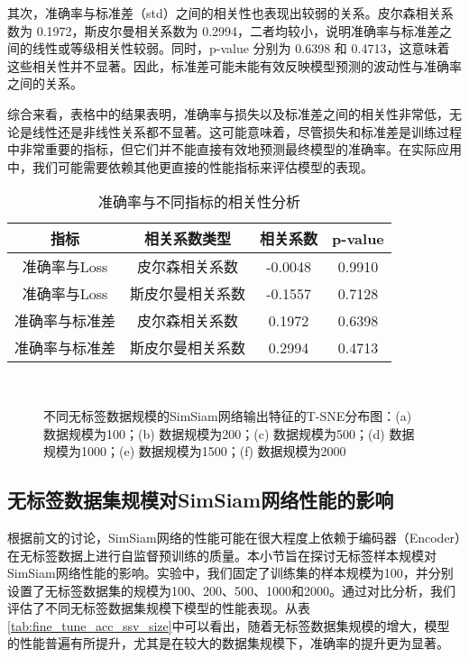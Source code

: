 \documentclass[master]{thesis-uestc}
\begin{document}
其次，准确率与标准差（std）之间的相关性也表现出较弱的关系。皮尔森相关系数为 0.1972，斯皮尔曼相关系数为 0.2994，二者均较小，说明准确率与标准差之间的线性或等级相关性较弱。同时，p-value 分别为 0.6398 和 0.4713，这意味着这些相关性并不显著。因此，标准差可能未能有效反映模型预测的波动性与准确率之间的关系。

综合来看，表格中的结果表明，准确率与损失以及标准差之间的相关性非常低，无论是线性还是非线性关系都不显著。这可能意味着，尽管损失和标准差是训练过程中非常重要的指标，但它们并不能直接有效地预测最终模型的准确率。在实际应用中，我们可能需要依赖其他更直接的性能指标来评估模型的表现。

\begin{table}
    \centering
    \caption{准确率与不同指标的相关性分析}
    \begin{tabular}{cccc}
    \toprule
    \textbf{指标} & \textbf{相关系数类型} & \textbf{相关系数} & \textbf{p-value} \\
    \midrule
    准确率与Loss     & 皮尔森相关系数   & -0.0048 & 0.9910 \\
    准确率与Loss     & 斯皮尔曼相关系数 & -0.1557 & 0.7128 \\
    准确率与标准差      & 皮尔森相关系数   & 0.1972 & 0.6398 \\
    准确率与标准差      & 斯皮尔曼相关系数 & 0.2994 & 0.4713 \\
    \bottomrule
    \end{tabular}
    \label{tab:correlation_with_acc}
    \end{table}

\begin{figure}[h]
    \centering
    \\
    
    \caption{不同无标签数据规模的SimSiam网络输出特征的T-SNE分布图：(a) 数据规模为100；(b) 数据规模为200；(c) 数据规模为500；(d) 数据规模为1000；(e) 数据规模为1500；(f) 数据规模为2000}
    \label{tsne_diff_ssv_size}
\end{figure}
\subsection{无标签数据集规模对SimSiam网络性能的影响}
根据前文的讨论，SimSiam网络的性能可能在很大程度上依赖于编码器（Encoder）在无标签数据上进行自监督预训练的质量。本小节旨在探讨无标签样本规模对SimSiam网络性能的影响。实验中，我们固定了训练集的样本规模为100，并分别设置了无标签数据集的规模为100、200、500、1000和2000。通过对比分析，我们评估了不同无标签数据集规模下模型的性能表现。从表\ref{tab:fine_tune_acc_ssv_size}中可以看出，随着无标签数据集规模的增大，模型的性能普遍有所提升，尤其是在较大的数据集规模下，准确率的提升更为显著。
\end{document}
